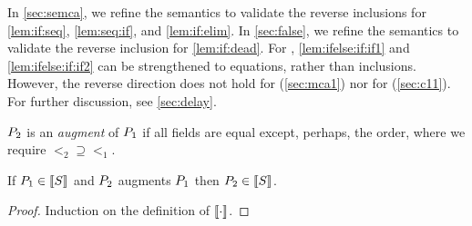 In \textsection\ref{sec:semca}, we refine the semantics to validate the
reverse inclusions for \eqref{lem:if:seq}, \eqref{lem:seq:if}, and
\eqref{lem:if:elim}.
In \textsection\ref{sec:false}, we refine the semantics to validate the
reverse inclusion for \eqref{lem:if:dead}.
For , 
\eqref{lem:ifelse:if:if1} and \eqref{lem:ifelse:if:if2} can be strengthened
to equations, rather than inclusions.  However, the reverse direction does
not hold for \PwTmca{} (\textsection\ref{sec:mca1}) nor for \PwTpo{} (\textsection\ref{sec:c11}).
For further discussion, see \textsection\ref{sec:delay}.
\begin{definition}
  \label{def:augment}
  $P_2$ is an \emph{augment} of $P_1$ if all fields are equal except,
  perhaps, the order, where we require ${\lt_2}\supseteq{\lt_1}$.
\end{definition}
\begin{lemma}
  If $\aPS_1\in\sembase{\aCmd}$ and $P_2$  augments $P_1$ then $\aPS_2\in\sembase{\aCmd}$.

  \vspace{-.5\baselineskip}
  \begin{proof}
    Induction on the definition of $\sembase{}$.
  \end{proof}
\end{lemma}






